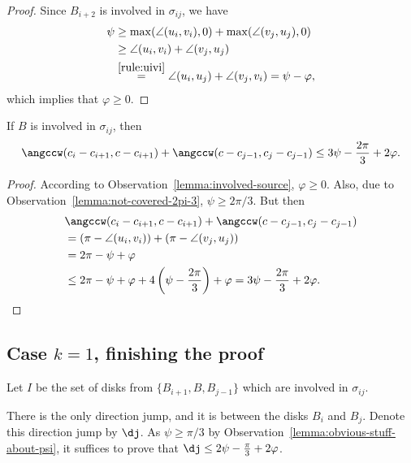 \begin{enumerate}[label={\bf Case \arabic*: }, wide, labelwidth=!, labelindent=0pt]
\begin{proof}

Since $B_{i+2}$ is involved in $\sigma_{ij}$, we have
\begin{align*}
    \psi & \geq\max(\angle(u_i, v_i), 0) + \max(\angle(v_j, u_j), 0) \\
    & \geq\angle(u_i, v_i) + \angle(v_j, u_j) \\
    & \stackrel{\ref{rule:uivi}}{=} \angle(u_i, u_j) + \angle(v_j, v_i) = \psi - \varphi,
\end{align*}
which implies that $\varphi\geq 0$.\end{proof}

\begin{corollary}\label{lemma:middle-involved-side-angles}
If $B$ is involved in $\sigma_{ij}$, then
$$\angccw(c_i - c_{i+1}, c - c_{i+1}) + \angccw(c - c_{j-1}, c_j - c_{j-1})\leq 3\psi - \frac{2\pi}{3} + 2\varphi.$$
\end{corollary}

\begin{proof}
According to Observation~\ref{lemma:involved-source}, $\varphi\geq 0$. Also, due to Observation~\ref{lemma:not-covered-2pi-3}, $\psi\geq2\pi/3$. But then
\begin{align*}
    & \angccw(c_i - c_{i+1}, c - c_{i+1}) + \angccw(c - c_{j-1}, c_j - c_{j-1}) \\
    & = (\pi - \angle(u_i, v_i)) + (\pi - \angle(v_j, u_j)) \\
    & = 2\pi - \psi + \varphi \\
    & \leq 2\pi - \psi + \varphi + 4\left(\psi - \frac{2\pi}{3}\right) + \varphi = 3\psi - \frac{2\pi}{3} + 2\varphi.
\end{align*}
\end{proof}

\subsection{Case $k = 1$, finishing the proof}

Let $I$ be the set of disks from $\{B_{i+1}, B, B_{j-1}\}$ which are involved in $\sigma_{ij}$.


There is the only direction jump, and it is between the disks $B_i$ and $B_j$. Denote this direction jump by $\dj$. As $\psi\geq\pi/3$ by Observation~\ref{lemma:obvious-stuff-about-psi}, it suffices to prove that $\dj\leq 2\psi - \frac{\pi}{3} + 2\varphi$.


\end{enumerate}
